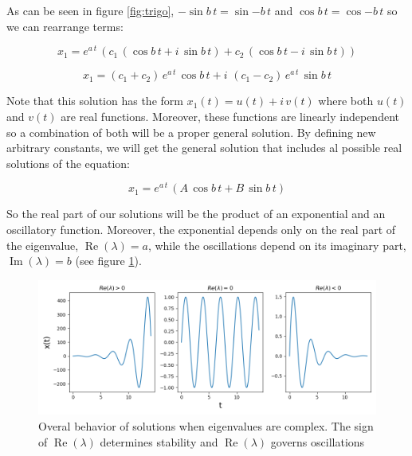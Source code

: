 \documentclass[12pt]{article}
\begin{document}
As can be seen in  figure \ref{fig:trigo}, $- \sin{b \, t}=\sin{- b \, t}$ and $\cos{b \, t}=\cos{ - b \, t}$ so we can rearrange terms:

\begin{equation}
	x_1= e^{a \, t} \,  \left( c_1  \, \left(  \cos{ b \, t} + i \, \sin{ b \, t} \right)+ c_2 \, \left( \cos{ b \, t} - i \, \sin{ b \, t} \right) \right) \nonumber
\end{equation}


\begin{equation}
	x_1=   \left( c_1+c_2\right) \, e^{a \, t} \, \cos{ b \, t}  + i \, \,\left( c_1-c_2 \right) \,e^{a \, t} \,   \sin{ b \, t}   \nonumber
\end{equation}

Note that this solution has the form $x_1(t) = u(t) + i \, v(t)$ where both $u(t)$ and $v(t)$ are real functions. Moreover, these functions are linearly independent so a combination of both will be a proper general solution. By defining new arbitrary constants, we will get the general solution that includes al possible real solutions of the equation:

\begin{equation}
	x_1=   e^{a \, t} \,  \left(  A  \, \cos{ b \, t}  +  B  \,   \sin{ b \, t}  \right) \nonumber
\end{equation}

So the real part of our solutions will be the product of an exponential and an oscillatory function. Moreover, the exponential depends only on the real part of the eigenvalue, $\operatorname{Re}(\lambda) = a$, while the oscillations depend on its imaginary part,  $\operatorname{Im}(\lambda) =b$ (see figure \ref{fig:cmplxeigen}). 

\begin{figure}
	\begin{center}
		\includegraphics[width=\textwidth]{complex_eigen}
	\end{center}
	\caption{Overal behavior of solutions when eigenvalues are complex. The sign of $\operatorname{Re}(\lambda)$ determines stability and $\operatorname{Re}(\lambda)$ governs oscillations}
	\label{fig:cmplxeigen}
\end{figure}
\end{document}
